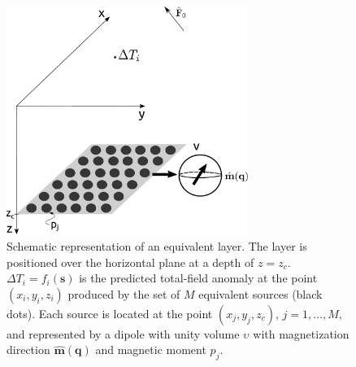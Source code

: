 

\begin{figure}
	\centering
	\includegraphics[width=0.7\textwidth]{Fig/figure1.pdf}
	\caption{Schematic representation of an equivalent layer. The layer is positioned over the horizontal plane at a depth of $z=z_c$. $\Delta T_i =  f_i (\mathbf{s})$ is the predicted total-field anomaly at the point $(x_i,y_i,z_i)$ produced by the set of $M$ equivalent sources (black dots). Each source is located at the point $(x_j,y_j,z_c)$, $j = 1,\hdots, M$, and represented by a dipole with unity volume $\upsilon$ with magnetization direction $\hat{\mathbf{m}}(\mathbf{q})$ and magnetic moment $p_j$.    }
	\label{fig:eqlayer_figure}
\end{figure}




